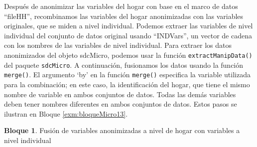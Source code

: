 \documentclass[]{book}
\theoremstyle{definition}
\theoremstyle{definition}
\newtheorem{example}{Bloque}[chapter]
\theoremstyle{definition}
\theoremstyle{definition}
\theoremstyle{remark}
\begin{document}
Después de anonimizar las variables del hogar con base en el marco de datos ``fileHH'', recombinamos las variables del hogar anonimizadas con las variables originales, que se miden a nivel individual. Podemos extraer las variables de nivel individual del conjunto de datos original usando ``INDVars'', un vector de cadena con los nombres de las variables de nivel individual. Para extraer los datos anonimizados del objeto sdcMicro, podemos usar la función \texttt{extractManipData()} del paquete \texttt{sdcMicro}. A continuación, fusionamos los datos usando la función \texttt{merge()}. El argumento `by' en la función \texttt{merge()} especifica la variable utilizada para la combinación; en este caso, la identificación del hogar, que tiene el mismo nombre de variable en ambos conjuntos de datos. Todas las demás variables deben tener nombres diferentes en ambos conjuntos de datos. Estos pasos se ilustran en Bloque \ref{exm:bloqueMicro13}.

\begin{example}
\protect\hypertarget{exm:bloqueMicro13}{}{\label{exm:bloqueMicro13} }Fusión de variables anonimizadas a nivel de hogar con variables a nivel individual
\end{example}
\end{document}

